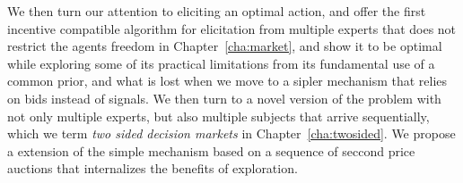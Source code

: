 We then turn our attention to eliciting an optimal action, and offer the first incentive compatible algorithm for elicitation from multiple experts that does not restrict the agents freedom in Chapter~\ref{cha:market}, and show it to be optimal while exploring some of its practical limitations from its fundamental use of a common prior, and what is lost when we move to a sipler mechanism that relies on bids instead of signals. We then turn to a novel version of the problem with not only multiple experts, but also multiple subjects that arrive sequentially, which we term \emph{two sided decision markets} in Chapter~\ref{cha:twosided}. We propose a extension of the simple mechanism based on a sequence of seccond price auctions that internalizes the benefits of exploration.

